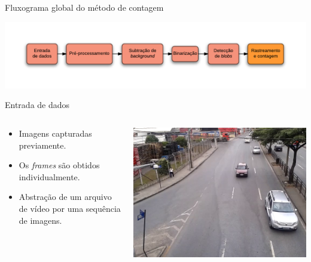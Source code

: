 \begin{frame}{Fluxograma global do método de contagem}
  \begin{center}
    \includegraphics[scale=0.6]{imgs/general_process.pdf}
  \end{center}
\end{frame}

\begin{frame}{Entrada de dados}
  \begin{columns}[T]
    \begin{column}{.5\textwidth}
      \begin{itemize}
        \item Imagens capturadas previamente.
        \item Os \textit{frames} são obtidos individualmente.
        \item Abstração de um arquivo de vídeo por uma sequência de imagens.
      \end{itemize}
    \end{column}
    \begin{column}{.5\textwidth}
      \begin{block}{}
        \includegraphics[width=\textwidth]{imgs/frame.png}
      \end{block}
    \end{column}
  \end{columns}
\end{frame}

